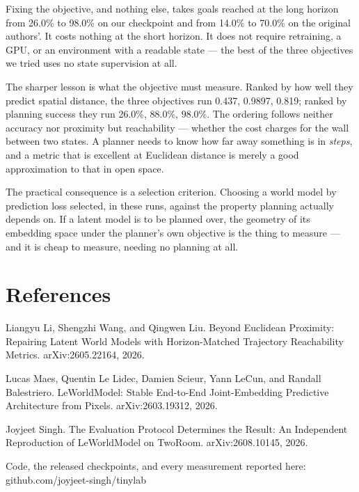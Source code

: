 \documentclass[10pt]{article}
\begin{document}
Fixing the objective, and nothing else, takes goals reached at the long
horizon from 26.0\% to 98.0\% on our checkpoint and from 14.0\% to 70.0\% on the
original authors'. It costs nothing at the short horizon. It does not require
retraining, a GPU, or an environment with a readable state --- the best of the
three objectives we tried uses no state supervision at all.

The sharper lesson is what the objective must measure. Ranked by how well
they predict spatial distance, the three objectives run 0.437, 0.9897, 0.819;
ranked by planning success they run 26.0\%, 88.0\%, 98.0\%. The ordering follows
neither accuracy nor proximity but reachability --- whether the cost charges
for the wall between two states. A planner needs to know how far away
something is in \emph{steps}, and a metric that is excellent at Euclidean distance
is merely a good approximation to that in open space.

The practical consequence is a selection criterion. Choosing a world model by
prediction loss selected, in these runs, against the property planning
actually depends on. If a latent model is to be planned over, the geometry of
its embedding space under the planner's own objective is the thing to measure
--- and it is cheap to measure, needing no planning at all.

\section{References}\label{references}

Liangyu Li, Shengzhi Wang, and Qingwen Liu. Beyond Euclidean Proximity:
Repairing Latent World Models with Horizon-Matched Trajectory Reachability
Metrics. arXiv:2605.22164, 2026.

Lucas Maes, Quentin Le Lidec, Damien Scieur, Yann LeCun, and Randall
Balestriero. LeWorldModel: Stable End-to-End Joint-Embedding Predictive
Architecture from Pixels. arXiv:2603.19312, 2026.

Joyjeet Singh. The Evaluation Protocol Determines the Result: An Independent
Reproduction of LeWorldModel on TwoRoom. arXiv:2608.10145, 2026.

Code, the released checkpoints, and every measurement reported here:
github.com/joyjeet-singh/tinylab
\end{document}
